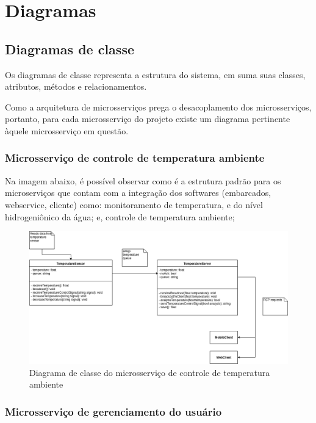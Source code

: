 \section{Diagramas}

\subsection{Diagramas de classe}

Os diagramas de classe representa a estrutura do sistema, em suma suas classes, atributos, métodos e relacionamentos. 

Como a arquitetura de microsserviços prega o desacoplamento dos microsserviços, portanto, para cada microsserviço do projeto existe um diagrama pertinente àquele microsserviço em questão.

\subsubsection{Microsserviço de controle de temperatura ambiente}

Na imagem abaixo, é possível observar como é a estrutura padrão para os microserviços que contam com a integração dos softwares (embarcados, webservice, cliente) como: monitoramento de temperatura, e do nível hidrogeniônico da água; e, controle de temperatura ambiente;

\begin{figure}[H]
	\centering
	\includegraphics[width=17cm]{figuras/microservico_temperatura.png}
	\caption{Diagrama de classe do microsserviço de controle de temperatura ambiente} \label{microservico_temperatura}
\end{figure}

\subsubsection{Microsserviço de gerenciamento do usuário}

